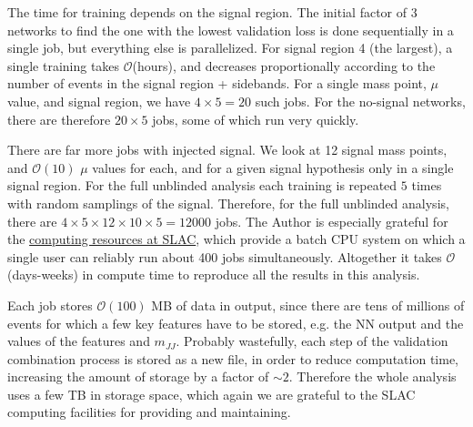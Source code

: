 The time for training depends on the signal region.
The initial factor of 3 networks to find the one with the lowest validation loss is done sequentially in a single job, but everything else is parallelized.
For signal region 4 (the largest), a single training takes $\mathcal{O}$(hours), and decreases proportionally according to the number of events in the signal region + sidebands.
For a single mass point, $\mu$ value, and signal region, we have $4\times 5 = 20$ such jobs.
For the no-signal networks, there are therefore $20\times 5$ jobs, some of which run very quickly.

There are far more jobs with injected signal.
We look at 12 signal mass points, and $\mathcal{O}(10)$ $\mu$ values for each, and for a given signal hypothesis only in a single signal region.
For the full unblinded analysis each training is repeated $5$ times with random samplings of the signal.
Therefore, for the full unblinded analysis, there are $4\times 5\times 12\times 10\times 5 = 12000$ jobs.
The Author is especially grateful for the \href{https://atlas.slac.stanford.edu/using-the-slac-computing-resourcesi}{computing resources at SLAC}, which provide a batch CPU system on which a single user can reliably run about 400 jobs simultaneously.
Altogether it takes $\mathcal{O}$(days-weeks) in compute time to reproduce all the results in this analysis. 

Each job stores $\mathcal{O}(100)$ MB of data in output, since there are tens of millions of events for which a few key features have to be stored, e.g. the NN output and the values of the features and $m_{JJ}$.
Probably wastefully, each step of the validation combination process is stored as a new file, in order to reduce computation time, increasing the amount of storage by a factor of $\sim 2$.
Therefore the whole analysis uses a few TB in storage space, which again we are grateful to the SLAC computing facilities for providing and maintaining.
